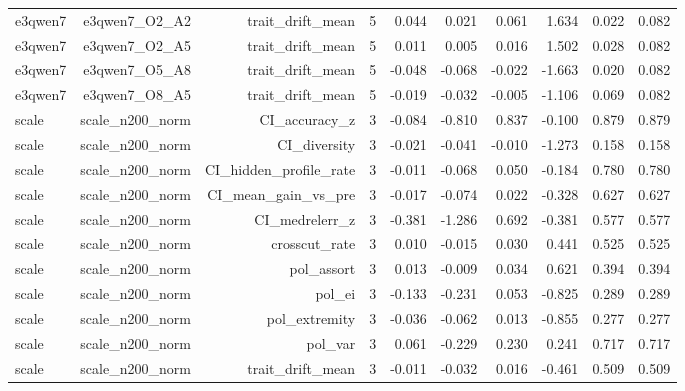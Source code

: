 \documentclass[11pt]{article}
\begin{document}
\begin{landscape}
\begin{longtable}{@{}lrrrrrrrrr@{}}
e3qwen7 & e3qwen7\_O2\_A2 & trait\_drift\_mean & 5 & 0.044 & 0.021 & 0.061 & 1.634 & 0.022 & 0.082 \\
e3qwen7 & e3qwen7\_O2\_A5 & trait\_drift\_mean & 5 & 0.011 & 0.005 & 0.016 & 1.502 & 0.028 & 0.082 \\
e3qwen7 & e3qwen7\_O5\_A8 & trait\_drift\_mean & 5 & -0.048 & -0.068 & -0.022 & -1.663 & 0.020 & 0.082 \\
e3qwen7 & e3qwen7\_O8\_A5 & trait\_drift\_mean & 5 & -0.019 & -0.032 & -0.005 & -1.106 & 0.069 & 0.082 \\
scale & scale\_n200\_norm & CI\_accuracy\_z & 3 & -0.084 & -0.810 & 0.837 & -0.100 & 0.879 & 0.879 \\
scale & scale\_n200\_norm & CI\_diversity & 3 & -0.021 & -0.041 & -0.010 & -1.273 & 0.158 & 0.158 \\
scale & scale\_n200\_norm & CI\_hidden\_profile\_rate & 3 & -0.011 & -0.068 & 0.050 & -0.184 & 0.780 & 0.780 \\
scale & scale\_n200\_norm & CI\_mean\_gain\_vs\_pre & 3 & -0.017 & -0.074 & 0.022 & -0.328 & 0.627 & 0.627 \\
scale & scale\_n200\_norm & CI\_medrelerr\_z & 3 & -0.381 & -1.286 & 0.692 & -0.381 & 0.577 & 0.577 \\
scale & scale\_n200\_norm & crosscut\_rate & 3 & 0.010 & -0.015 & 0.030 & 0.441 & 0.525 & 0.525 \\
scale & scale\_n200\_norm & pol\_assort & 3 & 0.013 & -0.009 & 0.034 & 0.621 & 0.394 & 0.394 \\
scale & scale\_n200\_norm & pol\_ei & 3 & -0.133 & -0.231 & 0.053 & -0.825 & 0.289 & 0.289 \\
scale & scale\_n200\_norm & pol\_extremity & 3 & -0.036 & -0.062 & 0.013 & -0.855 & 0.277 & 0.277 \\
scale & scale\_n200\_norm & pol\_var & 3 & 0.061 & -0.229 & 0.230 & 0.241 & 0.717 & 0.717 \\
scale & scale\_n200\_norm & trait\_drift\_mean & 3 & -0.011 & -0.032 & 0.016 & -0.461 & 0.509 & 0.509 \\
\bottomrule
\end{longtable}
\normalsize
\end{landscape}

\medskip
\end{document}
